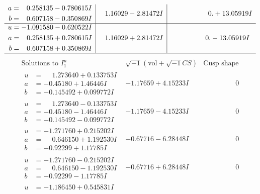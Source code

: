 \documentclass[1p]{elsarticle_modified}
\theoremstyle{definition}
\newcommand{\I}{\sqrt{-1}}
\begin{document}
$$\begin{array}{c|c|c}
\begin{aligned}
a &= \phantom{-}0.258135 - 0.780615 I \\
b &= \phantom{-}0.607158 - 0.350869 I\end{aligned}
 & \phantom{-}1.16029 - 2.81472 I & \phantom{-0.000000 -}0. + 13.05919 I \\ \hline\begin{aligned}
u &= -1.091580 - 0.620522 I \\
a &= \phantom{-}0.258135 + 0.780615 I \\
b &= \phantom{-}0.607158 + 0.350869 I\end{aligned}
 & \phantom{-}1.16029 + 2.81472 I & \phantom{-0.000000 } 0. - 13.05919 I\\
 \hline 
 \end{array}$$\newpage$$\begin{array}{c|c|c}  
\text{Solutions to }I^u_{1}& \I (\text{vol} + \sqrt{-1}CS) & \text{Cusp shape}\\
 \hline 
\begin{aligned}
u &= \phantom{-}1.273640 + 0.133753 I \\
a &= -0.45180 + 1.46446 I \\
b &= -0.145492 + 0.099772 I\end{aligned}
 & -1.17659 + 4.15233 I & \phantom{-0.000000 } 0 \\ \hline\begin{aligned}
u &= \phantom{-}1.273640 - 0.133753 I \\
a &= -0.45180 - 1.46446 I \\
b &= -0.145492 - 0.099772 I\end{aligned}
 & -1.17659 - 4.15233 I & \phantom{-0.000000 } 0 \\ \hline\begin{aligned}
u &= -1.271760 + 0.215202 I \\
a &= \phantom{-}0.646150 + 1.192530 I \\
b &= -0.92299 + 1.17785 I\end{aligned}
 & -0.67716 - 6.28448 I & \phantom{-0.000000 } 0 \\ \hline\begin{aligned}
u &= -1.271760 - 0.215202 I \\
a &= \phantom{-}0.646150 - 1.192530 I \\
b &= -0.92299 - 1.17785 I\end{aligned}
 & -0.67716 + 6.28448 I & \phantom{-0.000000 } 0 \\ \hline\begin{aligned}
u &= -1.186450 + 0.545831 I \\

\end{aligned}
\end{array}$$
\end{document}
